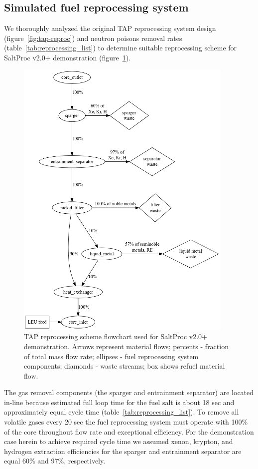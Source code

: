 \documentclass[12pt]{article} %
\begin{document}
\subsection{Simulated fuel reprocessing system}
We thoroughly analyzed the original \gls{TAP} reprocessing system design 
(figure~\ref{fig:tap-reproc}) and neutron poisons removal rates 
(table~\ref{tab:reprocessing_list}) to determine suitable reprocessing 
scheme for SaltProc v2.0+ demonstration (figure~\ref{fig:demo-repro-scheme}).
\begin{figure}[htp!] %
  \centering
		  \includegraphics[width=0.93\textwidth]{demo_reprocessing_scheme.png}
  \caption{\gls{TAP} reprocessing scheme flowchart used for SaltProc v2.0+ 
  demonstration. Arrows represent material flows; percents - fraction of total 
  mass flow rate; ellipses - fuel reprocessing system 
  components; diamonds - waste streams; box shows refuel material flow.}
  \label{fig:demo-repro-scheme}
\end{figure}

The gas removal components (the sparger and entrainment separator) are located 
in-line because estimated full loop time for the fuel salt is about 
18 sec and approximately equal cycle time (table~\ref{tab:reprocessing_list}). 
To remove all volatile gases every 20 sec the fuel reprocessing system must 
operate with 100\% of the core throughout flow rate and exceptional efficiency. 
For the demonstration case herein to achieve required cycle time we assumed 
xenon, krypton, and hydrogen extraction efficiencies for the sparger and 
entrainment separator are equal 60\% and 97\%, respectively.
\end{document}
